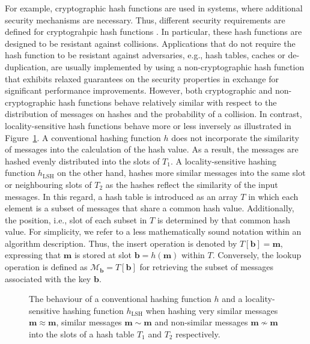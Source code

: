 \documentclass[../../../main.tex]{subfiles}
\begin{document}
For example, cryptographic hash functions are used in systems, where additional security mechanisms are necessary. Thus, different security requirements are defined for cryptograhpic hash functions \cite[349]{williamcryptography}. In particular, these hash functions are designed to be resistant against collisions. Applications that do not require the hash function to be resistant against adversaries, e.g., hash tables, caches or de-duplication, are usually implemented by using a non-cryptographic hash function that exhibits relaxed guarantees on the security properties in exchange for significant performance improvements. However, both cryptographic and non-cryptographic hash functions behave relatively similar with respect to the distribution of messages on hashes and the probability of a collision. In contrast, locality-sensitive hash functions behave more or less inversely as illustrated in Figure~\ref{fig:hashing_differences}. A conventional hashing function $h$ does not incorporate the similarity of messages into the calculation of the hash value. As a result, the messages are hashed evenly distributed into the slots of $T_1$. A locality-sensitive hashing function $h_{\text{LSH}}$ on the other hand, hashes more similar messages into the same slot or neighbouring slots of $T_2$ as the hashes reflect the similarity of the input messages. In this regard, a hash table is introduced as an array $T$ in which each element is a subset of messages that share a common hash value. Additionally, the position, i.e., slot of each subset in $T$ is determined by that common hash value. For simplicity, we refer to a less mathematically sound notation within an algorithm description. Thus, the insert operation is denoted by $T[\bm{b}] = \bm{m}$, expressing that $\bm{m}$ is stored at slot $\bm{b} = h(\bm{m})$ within $T$. Conversely, the lookup operation is defined as $\mathcal{M}_{\bm{b}} = T[\bm{b}]$ for retrieving the subset of messages associated with the key $\bm{b}$.
\begin{figure}[t!]
    \centering
    
    \caption{The behaviour of a conventional hashing function $h$ and a locality-sensitive hashing function $h_{\text{LSH}}$ when hashing very similar messages $\bm{m} \approx \bm{m}$, similar messages $\bm{m} \sim \bm{m}$ and non-similar messages $\bm{m} \not\sim \bm{m}$ into the slots of a hash table $T_1$ and $T_2$ respectively.}
    \label{fig:hashing_differences}
\end{figure}
\end{document}
